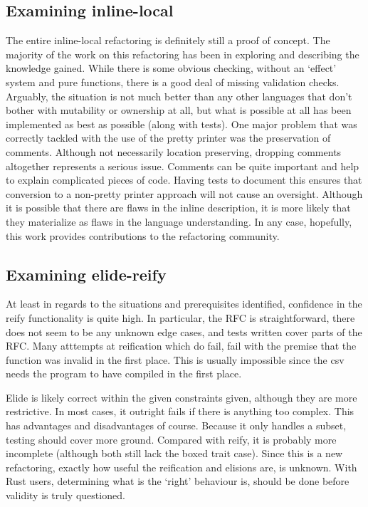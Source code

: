 \subsection{Examining inline-local}
The entire inline-local refactoring is definitely still a proof of concept. The majority of the work on this refactoring has been in exploring and describing the knowledge gained. While there is some obvious checking, without an `effect' system and pure functions, there is a good deal of missing validation checks. Arguably, the situation is not much better than any other languages that don't bother with mutability or ownership at all, but what is possible at all has been implemented as best as possible (along with tests). One major problem that was correctly tackled with the use of the pretty printer was the preservation of comments. Although not necessarily location preserving, dropping comments altogether represents a serious issue. Comments can be quite important and help to explain complicated pieces of code. Having tests to document this ensures that conversion to a non-pretty printer approach will not cause an oversight. Although it is possible that there are flaws in the inline description, it is more likely that they materialize as flaws in the language understanding. In any case, hopefully, this work provides contributions to the refactoring community.


\subsection{Examining elide-reify}

At least in regards to the situations and prerequisites identified, confidence in the reify functionality is quite high. In particular, the RFC is straightforward, there does not seem to be any unknown edge cases, and tests written cover parts of the RFC. Many atttempts at reification which do fail, fail with the premise that the function was invalid in the first place. This is usually impossible since the csv needs the program to have compiled in the first place. 

Elide is likely correct within the given constraints given, although they are more restrictive. In most cases, it outright fails if there is anything too complex. This has advantages and disadvantages of course. Because it only handles a subset, testing should cover more ground. Compared with reify, it is probably more incomplete (although both still lack the boxed trait case). Since this is a new refactoring, exactly how useful the reification and elisions are, is unknown. With Rust users, determining what is the `right' behaviour is, should be done before validity is truly questioned.

